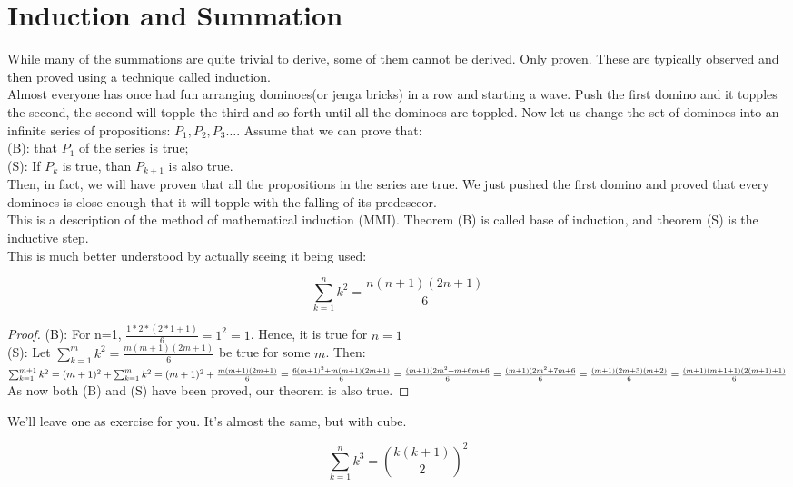 \section{Induction and Summation}
While many of the summations are quite trivial to derive, some of them cannot be derived. Only proven. These are typically observed and then proved using a technique called induction.\\
Almost everyone has once had fun arranging dominoes(or jenga bricks) in a row and starting a wave. Push the first domino and it topples the second, the second will topple the third and so forth until all the dominoes are toppled. Now let us change the set of dominoes into an infinite series of propositions: $P_1 , P_2, P_3 \dots$. Assume that we can prove
that:\\
(B): that $P_1$ of the series is true;\\
(S): If $P_k$ is true, than $P_{k+1}$ is also true.\\
Then, in fact, we will have proven that all the propositions in the series are true. We just pushed the first domino and proved that every dominoes is close enough that it will topple with the falling of its predesceor. \\
This is a description of the method of mathematical induction (MMI). Theorem (B) is called base of induction, and theorem (S) is the inductive step.\\
This is much better understood by actually seeing it being used:\\
\begin{theorem}
        \[\sum^n_{k=1}k^2=\frac{n(n+1)(2n+1)}{6}\]
\end{theorem}
\begin{proof}
    (B): For n=1, $\frac{1*2*(2*1+1)}{6}=1^2=1$. Hence, it is true for $n=1$\\
    (S): Let $\sum^m_{k=1}k^2=\frac{m(m+1)(2m+1)}{6}$ be true for some $m$. Then:\\
    $\sum^{m+1}_{k=1}k^2\\
    = (m+1)^2+\sum^m_{k=1}k^2\\
    = (m+1)^2 + \frac{m(m+1)(2m+1)}{6}\\
    = \frac{6(m+1)^2+m(m+1)(2m+1)}{6}\\
    = \frac{(m+1)(2m^2+m+6m+6}{6}\\
    = \frac{(m+1)(2m^2+7m+6}{6}\\
    =\frac{(m+1)(2m+3)(m+2)}{6}\\
    =\frac{(m+1)(m+1+1)(2(m+1)+1)}{6}$\\
    As now both (B) and (S) have been proved, our theorem is also true.
\end{proof}
We'll leave one as exercise for you. It's almost the same, but with cube.\\
\begin{theorem}
        \[\sum^n_{k=1}k^3=(\frac{k(k+1)}{2})^2\]
\end{theorem}
